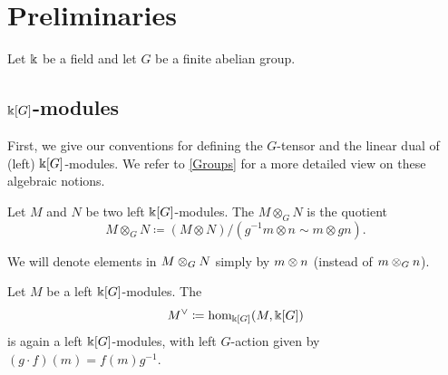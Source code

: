 
\section{Preliminaries}\label{Preliminaries}

Let \(\Bbbk\) be a field and let \(G\) be a finite abelian group.

\subsection{\(\Bbbk[G]\)-modules}\label{Gmodules}

First, we give our conventions for defining the \(G\)-tensor and the linear dual of (left) \(\Bbbk[G]\)-modules.
We refer to \cref{Groups} for a more detailed view on these algebraic notions.

\begin{definition}
	Let \(M\) and \(N\) be two left \(\Bbbk[G]\)-modules.
	The  \(M \otimes_G N\) is the quotient
	\[
	M \otimes_G N \coloneqq (M \otimes N)/(g^{-1}m \otimes n \sim m \otimes gn).
	\]
\end{definition}

We will denote elements in \(M \otimes_G N\) simply by \(m \otimes n\) (instead of \(m \otimes_G n\)).


%

\begin{definition}\label{defdual}
	Let \(M\) be a left \(\Bbbk[G]\)-modules.
	The 
	\[
	M^\vee \coloneqq \hom_{\Bbbk[G]}(M,\Bbbk[G])
	\]
	is again a left \(\Bbbk[G]\)-modules, with left \(G\)-action given by \((g \cdot f)(m) = f(m)g^{-1}\).
\end{definition}


